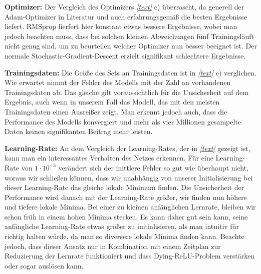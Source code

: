 \textbf{Optimizer:} Der Vergleich des Optimizers \textit{\autoref{text}} c) überrascht, da generell der Adam-Optimizer in Literatur und auch erfahrungsgemäß die besten Ergebnisse liefert. RMSprop lierfert hier konstant etwas bessere Ergebnisse, wobei man jedoch beachten muss, dass bei solchen kleinen Abweichungen fünf Trainingsläuft nicht genug sind, um zu beurteilen welcher Optimizer nun besser beeignet ist. Der normale Stochastic-Gradient-Descent erzielt signifikant schlechtere Ergebnisse. 

\textbf{Trainingsdaten:}
Die Größe des Sets an Trainingsdaten ist in \textit{\autoref{text}} e) verglichen. Wie erwartet nimmt der Fehler des Modells mit der Zahl an vorhandenen Trainingsdaten ab. Das gleiche gilt voraussichtlich für die Unsicherheit auf dem Ergebnis, auch wenn in unserem Fall das Modell, das mit den meisten Trainingsdaten einen Ausreißer zeigt. Man erkennt jedoch auch, dass die Performance des Modells konvergiert und mehr als vier Millionen gesampelte Daten keinen signifikanten Beitrag mehr leisten. 

\textbf{Learning-Rate:}
An dem Vergleich der Learning-Rates, der in \textit{\autoref{text}} gezeigt ist, kann man ein interessantes Verhalten des Netzes erkennen. Für eine Learning-Rate von $1 \cdot 10^{-3}$ verändert sich der mittlere Fehler so gut wie überhaupt nicht, woraus wir schließen können, dass wir unabhängig von unserer Initialisierung bei dieser Learning-Rate das gleiche lokale Minimum finden. Die Unsicherheit der Performance wird danach mit der Learning-Rate größer, wir finden nun höhere und tiefere lokale Minima. Bei einer zu kleinen anfänglichen Lernrate, bleiben wir schon früh in einem hohen Minima stecken. Es kann daher gut sein kann, seine anfängliche Learning-Rate etwas größer zu initialisieren, als man intuitiv für richtig halten würde, da man so diversere lokale Minima finden kann. Beachte jedoch, dass dieser Ansatz nur in Kombination mit einem Zeitplan zur Reduzierung der Lernrate funktioniert und dass \grqq Dying-ReLU\glqq-Problem verstärken oder sogar auslösen kann. 


